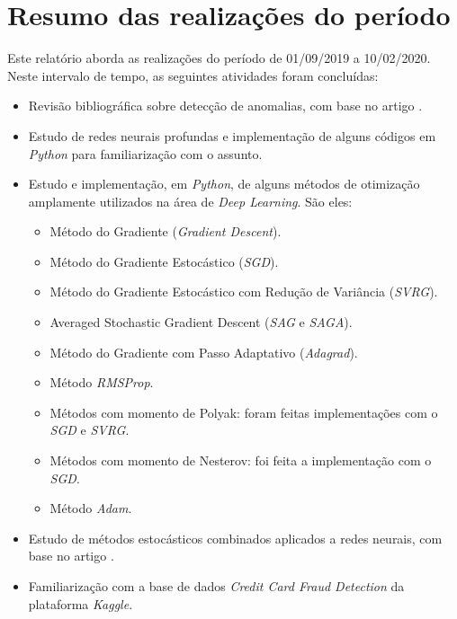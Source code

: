 \documentclass[a4paper,12pt]{article}
\begin{document}
\section*{Resumo das realizações do período}
Este relatório aborda as realizações do período de 01/09/2019 a 10/02/2020. Neste intervalo de tempo, as seguintes atividades foram concluídas:
\begin{itemize}

\item Revisão bibliográfica sobre detecção de anomalias, com base no artigo \cite{Chandola:2009}.

\item Estudo de redes neurais profundas e implementação de alguns códigos em \textit{Python} para familiarização com o assunto.

\item Estudo e implementação, em \textit{Python}, de alguns métodos de otimização amplamente utilizados na área de \textit{Deep Learning}. São eles:
\begin{itemize}
\item Método do Gradiente (\textit{Gradient Descent}).
\item Método do Gradiente Estocástico (\textit{SGD}).
\item Método do Gradiente Estocástico com Redução de Variância (\textit{SVRG}).
\item Averaged Stochastic Gradient Descent (\textit{SAG} e \textit{SAGA}).
\item Método do Gradiente com Passo Adaptativo (\textit{Adagrad}).
\item Método \textit{RMSProp}.
\item Métodos com momento de Polyak: foram feitas implementações com o \textit{SGD} e \textit{SVRG}.
\item Métodos com momento de Nesterov: foi feita a implementação com o \textit{SGD}.
\item Método \textit{Adam}.
\end{itemize}

\item Estudo de métodos estocásticos combinados aplicados a redes neurais, com base no artigo \cite{TCCLF}.

\item Familiarização com a base de dados \textit{Credit Card Fraud Detection} da plataforma \textit{Kaggle}.

\end{itemize}

\newpage
\end{document}
